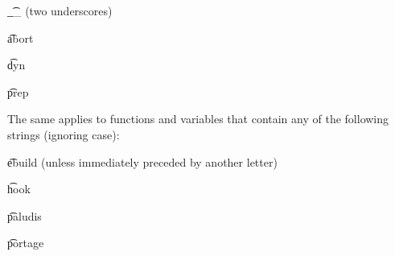 \begin{compactitem}
\item \t{__} (two underscores)
\item \t{abort}
\item \t{dyn}
\item \t{prep}
\end{compactitem}

The same applies to functions and variables that contain any of the following strings (ignoring
case):
\nobreakpar
\begin{compactitem}
\item \t{ebuild} (unless immediately preceded by another letter)
\item \t{hook}
\item \t{paludis}
\item \t{portage}
\end{compactitem}


